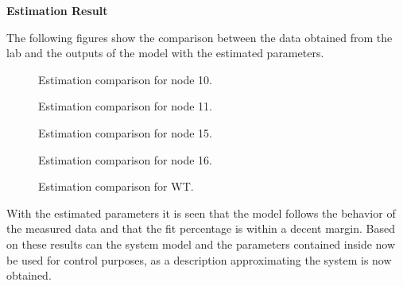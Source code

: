 \textbf{Estimation Result}

The following figures show the comparison between the data obtained from the lab and the outputs of the model with the estimated parameters.  

\begin{figure}[H]
  \centering
    
    \caption{Estimation comparison for node 10.}
\end{figure}

\begin{figure}[H]
   \centering
    
    \caption{Estimation comparison for node 11.}
\end{figure}

\begin{figure}[H]
   \centering
    
    \caption{Estimation comparison for node 15.}
\end{figure}

\begin{figure}[H]
   \centering
    
    \caption{Estimation comparison for node 16.}
\end{figure}


\begin{figure}[H]
   \centering
    
    \caption{Estimation comparison for WT.}
\end{figure}


With the estimated parameters it is seen that the model follows the behavior of the measured data and that the fit percentage is within a decent margin. 
Based on these results can the system model and the parameters contained inside now be used for control purposes, as a description approximating the 
system is now obtained.   

